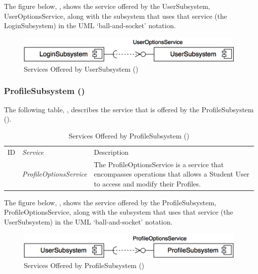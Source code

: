 \documentclass[12pt,letterpaper]{article}
\begin{document}
The figure below, , shows the service offered by the UserSubsystem, UserOptionsService, along with the subsystem that uses that service (the LoginSubsystem) in the UML `ball-and-socket' notation.

\begin{figure}[H]
	\centering{}
	\includegraphics[scale=0.40]{imgs/d3/services/user-subsystem.png}
	\caption{Services Offered by UserSubsystem ()}
\end{figure}

\subsubsection{ProfileSubsystem ()}

\noindent{}
The following table, , describes the service that is offered by the ProfileSubsystem ().

\begin{table}[H]
	\caption{Services Offered by ProfileSubsystem ()} 
	\begin{tabu} to 
		\tableheader{}ID & Service & Description\\
		 & ProfileOptionsService & The ProfileOptionsService is a service that encompasses operations that allows a Student User to access and modify their Profiles.\\
	\end{tabu}
\end{table}

The figure below, , shows the service offered by the ProfileSubsystem, ProfileOptionsService, along with the subsystem that uses that service (the UserSubsystem) in the UML `ball-and-socket' notation.

\begin{figure}[H]
	\centering{}
	\includegraphics[scale=0.40]{imgs/d3/services/profile-subsystem.png}
	\caption{Services Offered by ProfileSubsystem ()}
\end{figure}
\end{document}

